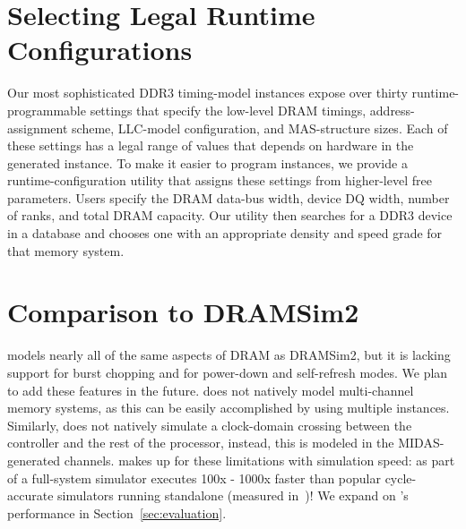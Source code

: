 \section{Selecting Legal Runtime Configurations}
Our most sophisticated DDR3 timing-model instances expose over thirty
runtime-programmable settings that specify the low-level DRAM timings,
address-assignment scheme, LLC-model configuration, and MAS-structure sizes.
Each of these settings has a legal range of values that depends on hardware in
the generated instance. To make it easier to program instances, we provide a
runtime-configuration utility that assigns these settings
from higher-level free parameters.
Users specify the DRAM data-bus width,
device DQ width, number of ranks, and total DRAM capacity. Our utility
then searches for a DDR3 device in a database and chooses one with an appropriate
density and speed grade for that memory system.

\section{Comparison to DRAMSim2} \PNAME models nearly all of the same
aspects of DRAM as DRAMSim2, but it is lacking support for burst
chopping and for power-down and self-refresh modes.
We plan to add these features in the future. \PNAME does not natively model
multi-channel memory systems, as this can be easily accomplished by using
multiple instances. Similarly, \PNAME does not natively simulate a clock-domain
crossing between the controller and the rest of the processor, instead, this is modeled in the MIDAS-generated channels.  \PNAME makes up for these
limitations with simulation speed: as part of a full-system
simulator \PNAME executes  100x - 1000x faster than popular cycle-accurate
simulators running standalone (measured in~\cite{ramulator})! We expand on
\PNAME's performance in Section~\ref{sec:evaluation}.
